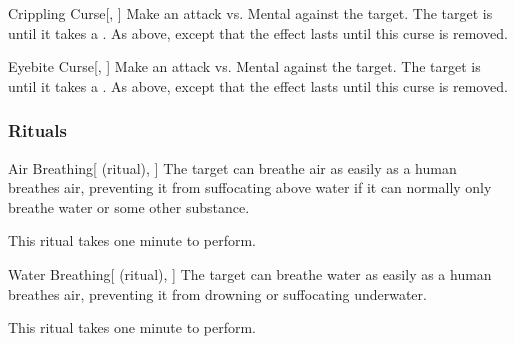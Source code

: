 \lowercase{\hypertarget{spell:Crippling Curse}{}}\label{spell:Crippling Curse}
\begin{freeability}[Rank 8]{\hypertarget{spell:Crippling Curse}{Crippling Curse}}[, ]
Make an attack vs. Mental against the target.
\hit The target is  until it takes a .
\crit As above, except that the effect lasts until this curse is removed.
\end{freeability}
\vspace{0.25em}



\lowercase{\hypertarget{spell:Eyebite Curse}{}}\label{spell:Eyebite Curse}
\begin{freeability}[Rank 8]{\hypertarget{spell:Eyebite Curse}{Eyebite Curse}}[, ]
Make an attack vs. Mental against the target.
\hit The target is  until it takes a .
\crit As above, except that the effect lasts until this curse is removed.
\end{freeability}
\vspace{0.25em}



\subsubsection{Rituals}


\lowercase{\hypertarget{spell:Air Breathing}{}}\label{spell:Air Breathing}
\begin{attuneability}[Rank 3]{\hypertarget{spell:Air Breathing}{Air Breathing}}[ (ritual), ]
The target can breathe air as easily as a human breathes air, preventing it from suffocating above water if it can normally only breathe water or some other substance.

This ritual takes one minute to perform.
\end{attuneability}
\vspace{0.25em}



\lowercase{\hypertarget{spell:Water Breathing}{}}\label{spell:Water Breathing}
\begin{attuneability}[Rank 3]{\hypertarget{spell:Water Breathing}{Water Breathing}}[ (ritual), ]
The target can breathe water as easily as a human breathes air, preventing it from drowning or suffocating underwater.

This ritual takes one minute to perform.
\end{attuneability}
\vspace{0.25em}



